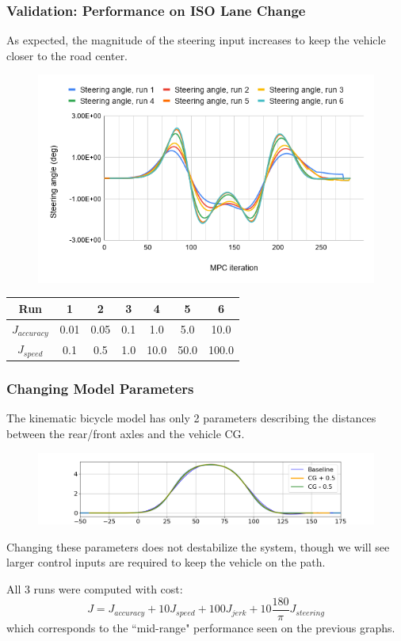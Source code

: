 \documentclass{beamer}
\begin{document}
\begin{frame}
\frametitle{Validation: Performance on ISO Lane Change}

As expected, the magnitude of the steering input increases to keep the vehicle closer to the road center.
\vspace{-0.5em}
\begin{figure}
	\includegraphics[width=0.8\linewidth]{steering_angle.png}
\end{figure}
\vspace{-0.5em}
\small
\begin{table}
	\begin{tabular}{c|cccccc}
		Run & 1 & 2 & 3 & 4 & 5 & 6
		\\\hline
		$J_{accuracy}$ & 0.01 & 0.05 & 0.1 & 1.0 & 5.0 & 10.0
		\\
		$J_{speed}$ & 0.1 & 0.5 & 1.0 & 10.0 & 50.0 & 100.0
	\end{tabular}
\end{table}
\normalsize
\end{frame}

\begin{frame}
\frametitle{Changing Model Parameters}

The kinematic bicycle model has only 2 parameters describing the distances between the rear/front axles and the vehicle CG.

\vspace{-0.5em}
\begin{figure}
	\includegraphics[width=1.0\linewidth]{road_paths_cg.png}
\end{figure}
\vspace{-0.5em}

Changing these parameters does not destabilize the system, though we will see larger control inputs are required to keep the vehicle on the path.

All 3 runs were computed with cost:
$$J = J_{accuracy} + 10 J_{speed} + 100J_{jerk} + 10\frac{180}{\pi} J_{steering}$$
which corresponds to the ``mid-range" performance seen on the previous graphs.
\end{frame}
\end{document}
